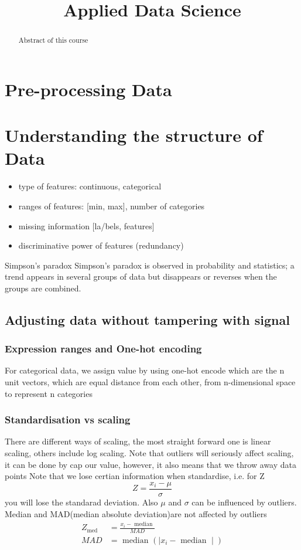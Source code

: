 \documentclass[12pt,a4paper]{article}
\newcommand{\topic}{Applied Data Science}
\begin{document}
\title{\topic}
\begin{titlepage}
    \maketitle
\end{titlepage}

\tableofcontents

\newpage
\begin{abstract}
\noindent
Abstract of this course
\end{abstract}
\section{Pre-processing Data}
\section{Understanding the structure of Data}
\begin{itemize}
    \item type of features: continuous, categorical
	\item ranges of features: [min, max], number of categories
	\item missing information [la/bels, features]
	\item discriminative power of features (redundancy)
\end{itemize}
\begin{theorem}
    {Simpson's paradox}
    {Simpson's paradox is observed in probability and statistics; a trend appears in several groups of data but disappears or reverses when the groups are combined.}
\end{theorem}

\subsection{Adjusting data without tampering with signal}
\subsubsection{Expression ranges and One-hot encoding}
For categorical data, we assign value by using one-hot encode which are the n unit vectors, which are equal distance from each other, from n-dimensional space to represent n categories
\subsubsection{Standardisation vs scaling}
There are different ways of scaling, the most straight forward one is linear scaling, others include log scaling.
Note that outliers will seriously affect scaling, it can be done by cap our value, however, it also means that we throw away data points
Note that we lose certian information when standardise, i.e. for Z 
$$
Z=\frac{x_i-\mu}{\sigma}
$$
you will lose the standarad deviation.
Also $\mu$ and $\sigma$ can be influenced by outliers. Median and MAD(median absolute deviation)are not affected by outliers
\begin{align}
    Z_{\text {med }} & =\frac{x_i-\text { median }}{M A D} \\
    M A D & =\text { median }\left(\mid x_i-\text { median } \mid\right)
\end{align} 
\end{document}
